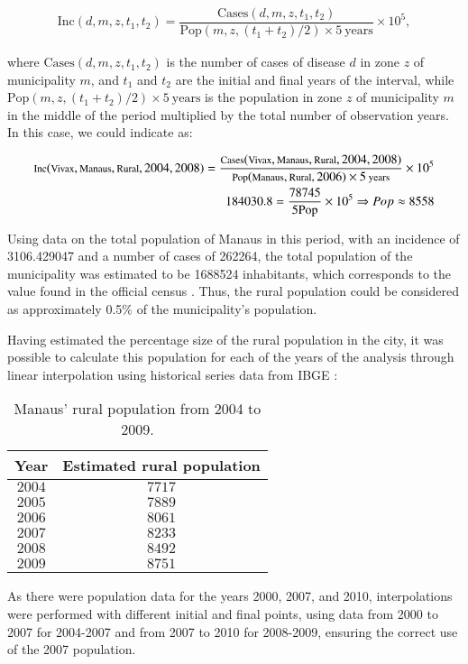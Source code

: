 \documentclass[3p,times]{elsarticle}
\begin{document}
\begin{align}
\text{Inc}(d, m, z, t_1, t_2) = \dfrac{\text{Cases}(d, m, z, t_1, t_2)}{\text{Pop}(m,z,(t_1+t_2)/2) \times 5 \ \text{years}} \times 10^5,
\end{align}

where $\text{Cases}(d, m, z, t_1, t_2)$ is the number of cases of disease $d$ in zone $z$ of municipality 
$m$, and $t_1$ and $t_2$ are the initial and final years of the interval, while 
$\text{Pop}(m,z,(t_1+t_2)/2) \times 5 \ \text{years}$ is the population in zone $z$ 
of municipality $m$ in the middle of the period multiplied by the total number 
of observation years. In this case, we could indicate as:

\begin{align}
    \footnotesize{\text{Inc}(\text{Vivax}, \text{Manaus}, \text{Rural}, 2004, 2008) = \dfrac{\text{Cases}(\text{Vivax}, \text{Manaus}, \text{Rural}, 2004, 2008)}{\text{Pop}(\text{Manaus}, \text{Rural}, 2006) \times 5 \ \text{years}} \times 10^5}  \\
    184030.8 = \dfrac{78745}{5\text{Pop}} \times 10^5 \Rightarrow Pop \approx 8558
\end{align}

Using data on the total population of Manaus in this period, 
with an incidence of 3106.429047 and a number of cases of 262264, the 
total population of the municipality was estimated to be 1688524 
inhabitants, which corresponds to the value found in the official census \cite{Datasus2006}. Thus, the rural population could be considered as 
approximately 0.5$\%$ of the municipality's population.

Having estimated the percentage size of the rural population 
in the city, it was possible to calculate this population for 
each of the years of the analysis through linear interpolation 
using historical series data from IBGE \cite{popIBGE}:

\begin{table}[h]
\caption{Manaus' rural population from 2004 to 2009.}
\centering
\begin{tabular}{|c | c|}
 \hline
 \textbf{Year} & \textbf{Estimated rural population}\\ 
 \hline
$2004$ & $7717$ \\
 \hline
 $2005$ & $7889$ \\
 \hline
 $2006$ & $8061$ \\
 \hline
 $2007$ & $8233$ \\
 \hline
 $2008$ & $8492$ \\
 \hline
 $2009$ & $8751$ \\
 \hline
\end{tabular}
\end{table}
As there were population data for the years 2000, 2007, and 2010, 
interpolations were performed with different initial and final 
points, using data from 2000 to 2007 for 2004-2007 and from 2007 
to 2010 for 2008-2009, ensuring the correct use of the 2007 population.
\end{document}
